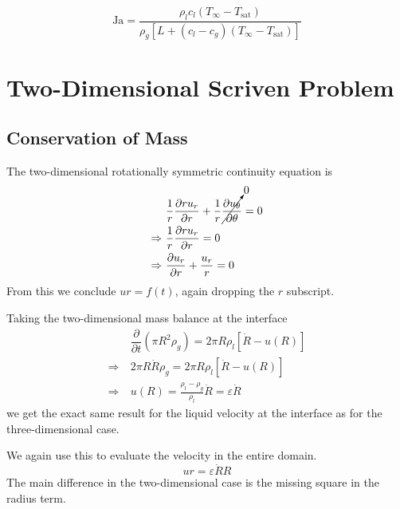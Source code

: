 \documentclass{article}
\numberwithin{equation}{section}
\newcommand{\pd}[2]{\dfrac{\partial #1}{\partial #2}}
\begin{document}
\begin{equation}
    \text{Ja}
    = \frac{\rho_l c_l (T_\infty - T_\text{sat})}
           {\rho_g \left[L + (c_l - c_g) (T_\infty - T_\text{sat})\right]}
\end{equation}

\section{Two-Dimensional Scriven Problem}

\subsection{Conservation of Mass}

The two-dimensional rotationally symmetric continuity equation is
\begin{equation}
    \begin{split}
        &\frac{1}{r} \pd{r u_r}{r} + \frac{1}{r} \cancelto{0}{\pd{u_\theta}{\theta}} = 0 \\
        \Rightarrow\ & \frac{1}{r} \pd{r u_r}{r} = 0 \\
        \Rightarrow\ & \pd{u_r}{r} + \frac{u_r}{r} = 0
    \end{split}
\end{equation}
From this we conclude $ur = f(t)$, again dropping the $r$ subscript.

Taking the two-dimensional mass balance at the interface
\begin{equation}
    \begin{split}
        &\pd{}{t} \left(\pi R^2 \rho_g\right) = 
        2\pi R \rho_l \left[\dot{R} - u(R)\right] \\
        \Rightarrow\ & 2\pi R \dot{R} \rho_g = 
        2\pi R \rho_l \left[\dot{R} - u(R)\right] \\
        \Rightarrow\ & u(R) = 
        \frac{\rho_l - \rho_g}{\rho_l} \dot{R} = \varepsilon \dot{R}
    \end{split}
\end{equation}
we get the exact same result for the liquid velocity at the interface as for the three-dimensional case.

We again use this to evaluate the velocity in the entire domain.
\begin{equation}
    ur = \varepsilon \dot{R} R
    \label{eq:velocity_condition_2d}
\end{equation}
The main difference in the two-dimensional case is the missing square in the radius term.
\end{document}
